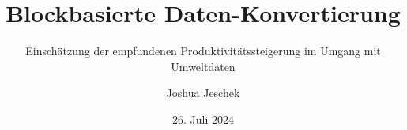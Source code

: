 \newcommand{\organization}{
    Technische Universität Chemnitz \\
    Fakultät Informatik \\
    Professur Medieninformatik \\
}
\newcommand{\thesistype}{Bachelorarbeit}
\newcommand{\degree}{Bachelor of Science}
\newcommand{\theauthor}{Joshua Jeschek}
\newcommand{\thetitle}{Blockbasierte Daten-Konvertierung}
\newcommand{\thesubtitle}{Einschätzung der empfundenen Produktivitätssteigerung im Umgang mit Umweltdaten}
\newcommand{\erstpruefer}{Dr. Thomas Wilhelm-Stein}
\newcommand{\zweitpruefer}{Dr. Werner Koch}
\newcommand{\place}{Chemnitz}
\date{26. Juli 2024}

\author{\theauthor}
\title{\thetitle}
\subtitle{\thesubtitle}
